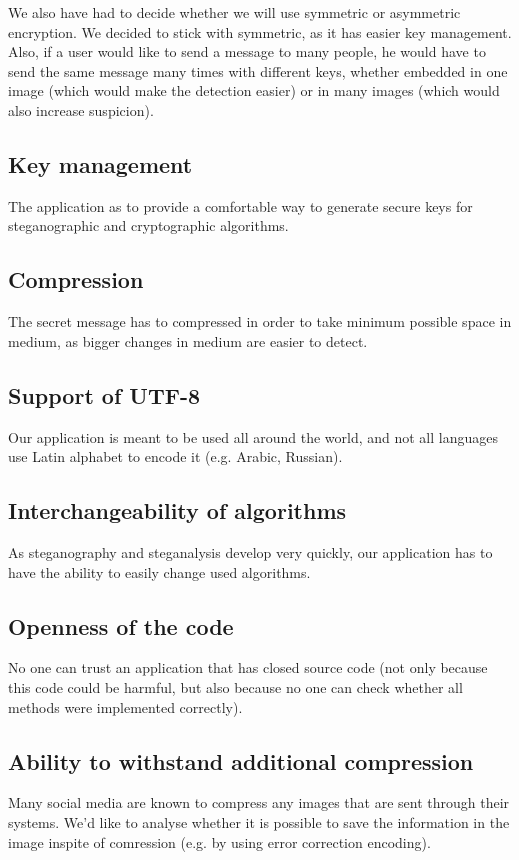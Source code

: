 We also have had to decide whether we will use symmetric or asymmetric
encryption. We decided to stick with symmetric, as it has easier key management.
Also, if a user would like to send a message to many people, he would have to
send the same message many times with different keys, whether embedded in one 
image (which would make the detection easier) or in many images (which would
also increase suspicion).

\subsection{Key management}
The application as to provide a comfortable way to generate secure keys for 
steganographic and cryptographic algorithms.

\subsection{Compression}
The secret message has to compressed in order to take minimum possible space in medium,
as bigger changes in medium are easier to detect.

\subsection{Support of UTF-8}
Our application is meant to be used all around the world, and not all languages use
Latin alphabet to encode it (e.g. Arabic, Russian). 

\subsection{Interchangeability of algorithms}
As steganography and steganalysis develop very quickly, our application
has to have the ability to easily change used algorithms.  

\subsection{Openness of the code}
No one can trust an application that has closed source code (not only because
this code could be harmful, but also because no one can check whether all
methods were implemented correctly).

\subsection{Ability to withstand additional compression}
Many social media are known to compress any images that are sent through
their systems. We'd like to analyse whether it is possible to save the information
in the image inspite of comression (e.g. by using error correction encoding).

